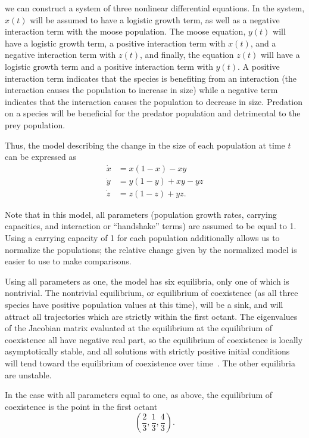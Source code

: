 \documentclass[10pt]{article}
\begin{document}
we can construct a system of three nonlinear differential equations. In the system, \(x(t)\) will be assumed to have a logistic growth term, as well as a negative interaction term with the moose population. The moose equation, \(y(t)\) will have a logistic growth term, a positive interaction term with \(x(t)\), and a negative interaction term with \(z(t)\), and finally, the equation \(z(t)\) will have a logistic growth term and a positive interaction term with \(y(t)\). A positive interaction term indicates that the species is benefiting from an interaction (the interaction causes the population to increase in size) while a negative term indicates that the interaction causes the population to decrease in size. Predation on a species will be beneficial for the predator population and detrimental to the prey population.

Thus, the model describing the change in the size of each population at time \(t\) can be expressed as
\begin{align*}
\dot{x} &= x(1-x)-xy \\
\dot{y} &= y(1-y)+xy-yz \\
\dot{z} &= z(1-z)+yz.
\end{align*}

Note that in this model, all parameters (population growth rates, carrying capacities, and interaction or ``handshake'' terms) are assumed to be equal to 1. Using a carrying capacity of 1 for each population additionally allows us to normalize the populations; the relative change given by the normalized model is easier to use to make comparisons.

Using all parameters as one, the model has six equilibria, only one of which is nontrivial. The nontrivial equilibrium, or equilibrium of coexistence (as all three species have positive population values at this time), will be a sink, and will attract all trajectories which are strictly within the first octant. The eigenvalues of the Jacobian matrix evaluated at the equilibrium at the equilibrium of coexistence all have negative real part, so the equilibrium of coexistence is locally asymptotically stable, and all solutions with strictly positive initial conditions will tend toward the equilibrium of coexistence over time~\cite{bdh}. The other equilibria are unstable.

In the case with all parameters equal to one, as above, the equilibrium of coexistence is the point in the first octant
\[\left( \frac{2}{3}, \frac{1}{3}, \frac{4}{3} \right). \]
\end{document}
